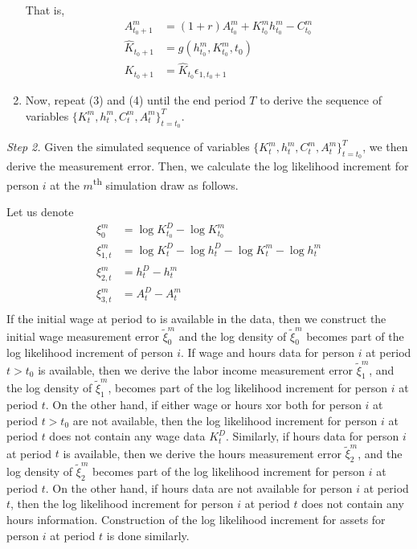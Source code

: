 \documentclass{article}
\begin{document}
\begin{enumerate}
      That is,
       \begin{equation*}
        \begin{split}
          A_{t_0+1}^m & = (1+r)A_{t_0}^m + K_{t_0}^m h_{t_0}^m - C_{t_0}^m \\
          \hat{K}_{t_0+1}& = g(h_{t_0}^m,  K_{t_0}^m, t_0) \\
           K_{t_0+1} & =  \hat{K}_{t_0} \epsilon_{1,t_0+1}
        \end{split}
      \end{equation*}
    \item Now, repeat (3) and (4) until the end period $T$ to derive the sequence of variables $\{K_t^m,h_t^m,C_t^m,A_t^m\}_{t=t_0}^T$.
    \end{enumerate}
    \textit{Step 2.}     Given the simulated sequence of variables $\{K_t^m,h_t^m,C_t^m,A_t^m\}_{t=t_0}^T$, we then derive the measurement error. Then, we calculate the log likelihood increment for person $i$  at the $m$\textsuperscript{th} simulation draw as follows.\par
    Let us denote
           \begin{equation*}
        \begin{split}
          \xi_0^m &= \log K_{t_0}^D - \log K_{t_0}^m \\
          \xi_{1,t}^m &= \log K_t^D - \log h_t^D - \log K_t^m - \log h_t^m \\
          \xi_{2,t}^m &= h_t^D - h_t^m \\
           \xi_{3,t}^m &=  A_t^D - A_t^m \\
        \end{split}
      \end{equation*}
If the initial wage at period to is available in the data, then we construct the initial wage measurement error $\tilde{\xi}_0^m$ and the log density of $\tilde{\xi}_0^m$ becomes part of the log likelihood increment of person $i$. If wage and hours data for person $i$ at period $t > t_0$ is available, then we derive the labor income measurement error  $\tilde{\xi}_1^m$, and the log density of  $\tilde{\xi}_1^m$, becomes part of the log likelihood increment for person $i$ at period $t$. On the other hand, if either wage or hours xor both for person $i$ at period $t > t_0$ are not available, then the log likelihood increment for person $i$ at period $t$ does not contain any wage data $K_t^D$. Similarly, if hours data for person $i$ at period $t$ is available, then we derive the hours measurement error $\tilde{\xi}_2^m$, and the log density of $\tilde{\xi}_2^m$ becomes part of the log likelihood increment for person $i$ at period $t$. On the other hand, if hours data are not available for person $i$ at period $t$, then the log likelihood increment for person $i$ at period $t$ does not contain any hours information. Construction of the log likelihood increment for assets for person $i$ at period $t$ is done similarly. \par
\end{document}
